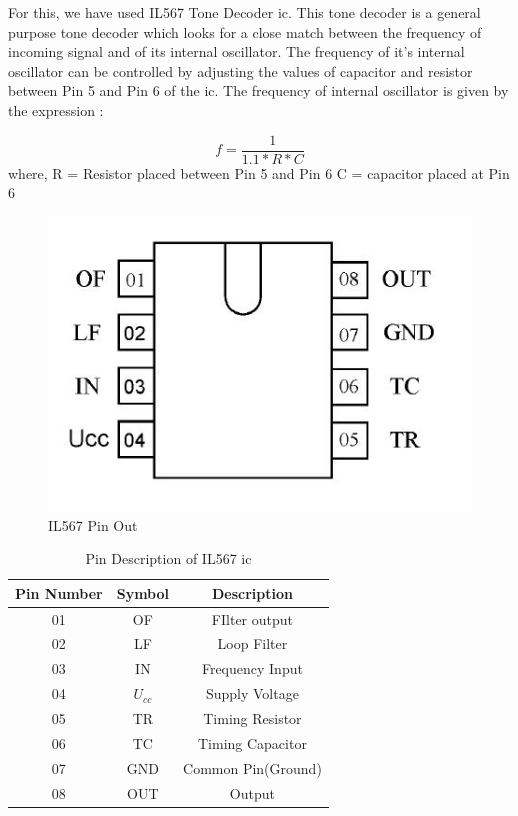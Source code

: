 For this, we have used IL567 Tone Decoder \gls{ic}. This tone decoder is a general purpose tone decoder which looks for a close match between the frequency of incoming signal and of its internal oscillator. The frequency of it's internal oscillator can be controlled by adjusting the values of capacitor and resistor between Pin 5 and Pin 6 of the \gls{ic}. The frequency of internal oscillator is given by the expression :\cite{Yichao}

\begin{equation}
	f=\frac{1}{1.1*R*C}
\end{equation}
where,
R = Resistor placed between Pin 5 and Pin 6
C = capacitor placed at Pin 6
\begin{figure}[h]
	\centering
	\includegraphics[scale=0.5]{Images/IL567PinOut.jpg}
	\caption{IL567 Pin Out}
	\label{fig:PinOut}
\end{figure}

\begin{table}[h!]
	\centering
	\begin{tabular}{|c|c|c|}
		\hline 
		\bf{Pin Number} & \bf{Symbol} & \bf{Description} \\ 
		\hline 
		01 & OF & FIlter output \\	
		02 & LF & Loop Filter \\
		03 & IN & Frequency Input \\	  
		04 & $U_{cc}$ & Supply Voltage \\	  
		05 & TR & Timing Resistor \\	  
		06 & TC & Timing Capacitor \\	  
		07 & GND & Common Pin(Ground) \\	  
		08 & OUT & Output \\ 
		\hline 
	\end{tabular} 
	\caption{Pin Description of IL567 \gls{ic}\cite{ToneDecoder}}
\end{table}

